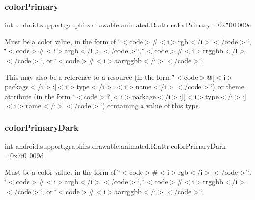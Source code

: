 \subsubsection{\texorpdfstring{color\+Primary}{colorPrimary}}
{\footnotesize\ttfamily int android.\+support.\+graphics.\+drawable.\+animated.\+R.\+attr.\+color\+Primary =0x7f01009c\hspace{0.3cm}{\ttfamily [static]}}

Must be a color value, in the form of \char`\"{}$<$code$>$\#$<$i$>$rgb$<$/i$>$$<$/code$>$\char`\"{}, \char`\"{}$<$code$>$\#$<$i$>$argb$<$/i$>$$<$/code$>$\char`\"{}, \char`\"{}$<$code$>$\#$<$i$>$rrggbb$<$/i$>$$<$/code$>$\char`\"{}, or \char`\"{}$<$code$>$\#$<$i$>$aarrggbb$<$/i$>$$<$/code$>$\char`\"{}. 

This may also be a reference to a resource (in the form \char`\"{}$<$code$>$@\mbox{[}$<$i$>$package$<$/i$>$\+:\mbox{]}$<$i$>$type$<$/i$>$\+:$<$i$>$name$<$/i$>$$<$/code$>$\char`\"{}) or theme attribute (in the form \char`\"{}$<$code$>$?\mbox{[}$<$i$>$package$<$/i$>$\+:\mbox{]}\mbox{[}$<$i$>$type$<$/i$>$\+:\mbox{]}$<$i$>$name$<$/i$>$$<$/code$>$\char`\"{}) containing a value of this type. \mbox{\label{classandroid_1_1support_1_1graphics_1_1drawable_1_1animated_1_1R_1_1attr_a58a314e2f56c4c87ad681ba81b51e277}} 
\subsubsection{\texorpdfstring{color\+Primary\+Dark}{colorPrimaryDark}}
{\footnotesize\ttfamily int android.\+support.\+graphics.\+drawable.\+animated.\+R.\+attr.\+color\+Primary\+Dark =0x7f01009d\hspace{0.3cm}{\ttfamily [static]}}

Must be a color value, in the form of \char`\"{}$<$code$>$\#$<$i$>$rgb$<$/i$>$$<$/code$>$\char`\"{}, \char`\"{}$<$code$>$\#$<$i$>$argb$<$/i$>$$<$/code$>$\char`\"{}, \char`\"{}$<$code$>$\#$<$i$>$rrggbb$<$/i$>$$<$/code$>$\char`\"{}, or \char`\"{}$<$code$>$\#$<$i$>$aarrggbb$<$/i$>$$<$/code$>$\char`\"{}. 

